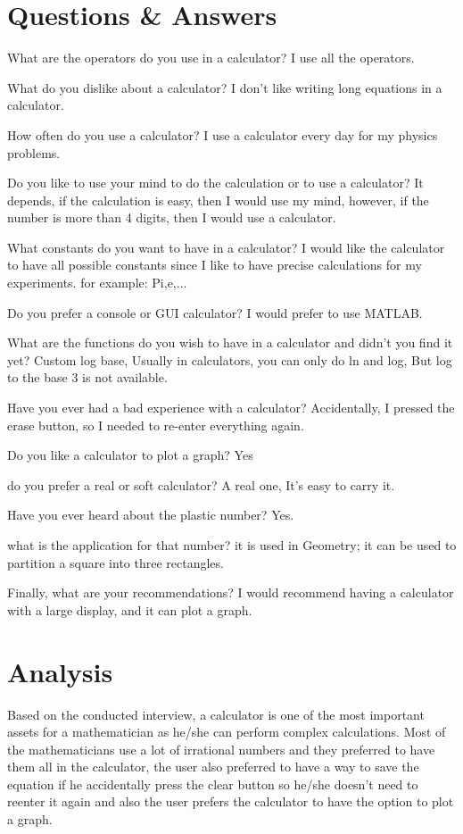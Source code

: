 \documentclass{report}
\begin{document}
\section{Questions \& Answers}
\begin{qanda}
 
\Q What are the operators do you use in a calculator?
\A I use all the operators.

\Q What do you dislike about a calculator?
\A I don't like writing long equations in a calculator.

\Q  How often do you use a calculator?
\A I use a calculator every day for my physics problems.

\Q  Do you like to use your mind to do the calculation or to use a calculator?
\A It depends, if the calculation is easy, then I would use my mind, however, if the number is more than 4 digits, then I would use a calculator.

\Q What constants do you want to have in a calculator?
\A I would like the calculator to have all possible constants since I like to have precise calculations for my experiments. for example: Pi,e,...

\Q Do you prefer a console or GUI calculator?
\A I would prefer to use MATLAB. 

\Q What are the functions do you wish to have in a calculator and didn't you find it yet?
\A Custom log base, Usually in calculators, you can only do ln and log, But log to the base 3 is not available.

\Q Have you ever had a bad experience with a calculator?
\A Accidentally, I pressed the erase button, so I needed to re-enter everything again.

\Q Do you like a calculator to plot a graph?
\A Yes

\Q do you prefer a real or soft calculator?
\A A real one, It's easy to carry it.

\Q Have you ever heard about the plastic number?
\A Yes.

\Q what is the application for that number?
\A it is used in Geometry; it can be used to partition a square into three rectangles.

\Q Finally, what are your recommendations?
\A I would recommend having a calculator with a large display, and it can plot a graph.

\section{Analysis}
Based on the conducted interview, a calculator is one of the most important assets for a mathematician as he/she can perform complex calculations.
Most of the mathematicians use a lot of irrational numbers and they preferred to have them all in the calculator, the user also preferred to have a way to save the equation if he accidentally press the clear button so he/she doesn't need to reenter it again and also the user prefers the calculator to have the option to plot a graph.


\end{qanda}
\newpage
\end{document}
